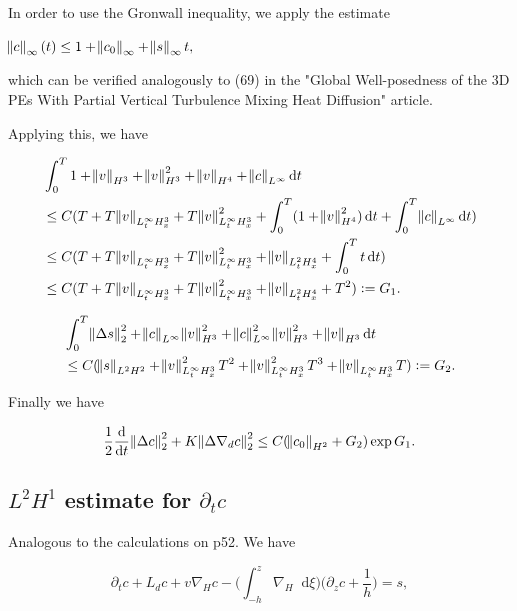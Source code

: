 \documentclass[11pt]{article}
\newcommand*\diff{\mathop{}\!\mathrm{d}}
\begin{document}
In order to use the Gronwall inequality, we apply the estimate

$\norm{c}_\infty (t) \leq 1 + \norm{c_0}_\infty + \norm{s}_\infty t,$

which can be verified analogously to (69) in the "Global Well-posedness of the 3D PEs With Partial Vertical Turbulence Mixing Heat Diffusion" article.

Applying this, we have

\begin{equation}
  \begin{split}
    & \int_0^T 1 + \norm{v}_{H^3} + \norm{v}_{H^3}^2 + \norm{v}_{H^4} + \norm{c}_{L^\infty} \diff t \\
    & \leq C (T + T\norm{v}_{L^\infty_t H^3_x} + T \norm{v}_{L^\infty_t H^3_x}^2 + \int_0^T (1 + \norm{v}_{H^4}^2) \diff t  +  \int_0^T \norm{c}_{L^\infty} \diff t )\\
    & \leq C (T + T\norm{v}_{L^\infty_t H^3_x} + T \norm{v}_{L^\infty_t H^3_x}^2 + \norm{v}_{L^2_t H^4_x}  +  \int_0^T t \diff t )\\
    & \leq C (T + T\norm{v}_{L^\infty_t H^3_x} + T \norm{v}_{L^\infty_t H^3_x}^2 + \norm{v}_{L^2_t H^4_x}  +  T^2) : = G_1.
  \end{split}
\end{equation}

\begin{equation}
  \begin{split}
    & \int_0^T \norm{\Delta s}_2^2 + \norm{c}_{L^\infty} \norm{v}_{H^3}^2 + \norm{c}_{L^\infty}^2 \norm{v}_{H^3}^2 + \norm{v}_{H^3} \diff t\\
    & \leq C (\norm{s}_{L^2 H^2} + \norm{v}_{L^\infty_t H^3_x}^2 T^2 + \norm{v}_{L^\infty_t H^3_x}^2 T^3 + \norm{v}_{L^\infty_t H^3_x} T) := G_2.
  \end{split}
\end{equation}

Finally we have

$$\frac{1}{2} \frac{\diff}{\diff t} \norm{\Delta c}_2^2 + K \norm{\Delta \nabla_d c}_2^2 \leq C (\norm{c_0}_{H^2} + G_2) \exp{G_1}. $$

\subsection{$L^2 H^1$ estimate for $\partial_t c$}

Analogous to the calculations on p52. We have

$$ \partial_t c + L_d c + v \nabla_H c - \bigg ( \int_{-h}^z \nabla_H \diff \xi \bigg ) \bigg ( \partial_z c + \frac{1}{h}\bigg) = s,$$
\end{document}
